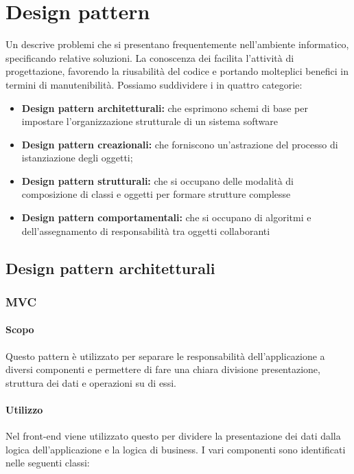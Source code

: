 \documentclass[12pt,a4paper]{article}
\begin{document}
\newpage



\newpage
\section{Design pattern}
Un  descrive problemi che si presentano frequentemente nell'ambiente informatico, specificando relative soluzioni. La conoscenza dei  facilita l’attività di progettazione, favorendo la riusabilità del codice e portando molteplici benefici in termini di manutenibilità. Possiamo suddividere i  in quattro categorie:

\begin{itemize}
	\item \textbf{Design pattern architetturali:} che esprimono schemi di base per impostare l’organizzazione strutturale di un sistema software
	\item \textbf{Design pattern creazionali:} che forniscono un’astrazione del processo di istanziazione degli oggetti;
	\item \textbf{Design pattern strutturali:} che si occupano delle modalità di composizione di classi e oggetti per formare strutture complesse
	\item \textbf{Design pattern comportamentali:} che si occupano di algoritmi e dell’assegnamento di responsabilità tra oggetti collaboranti
\end{itemize}

\subsection{Design pattern architetturali}
\subsubsection{MVC}
\paragraph{Scopo}
Questo pattern è utilizzato per separare le responsabilità dell’applicazione a diversi componenti e permettere di fare una chiara divisione presentazione, struttura dei dati e operazioni su di essi.

\paragraph{Utilizzo}
Nel front-end viene utilizzato questo  per dividere la presentazione dei dati dalla logica dell'applicazione e la logica di business. I vari componenti sono identificati nelle seguenti classi:
\end{document}
